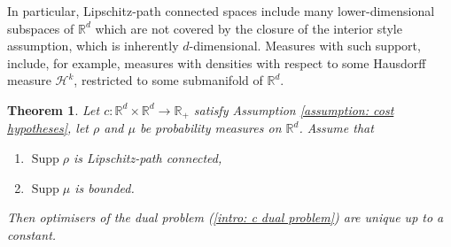 \documentclass[11pt, oneside, titlepage]{book}
\theoremstyle{plain}
\newtheorem{theorem}{Theorem}[chapter]
\theoremstyle{definition}
\newcommand{\R}{\mathbb{R}}
\DeclareMathOperator{\supp}{Supp}
\begin{document}
In particular, Lipschitz-path connected spaces include many lower-dimensional subspaces of $\R^d$ which are not covered by the closure of the interior style assumption, which is inherently $d$-dimensional. Measures with such support, include, for example, measures with densities with respect to some Hausdorff measure $\mathcal{H}^k$, restricted to some submanifold of $\R^d$.
\begin{theorem}
\label{thrm: uniqueness Lipschitz connected bounded}
Let $c: \R^d \times \R^d \to \R_+$ satisfy Assumption \ref{assumption: cost hypotheses}, let $\rho$ and $\mu$ be probability measures on $\R^d$.
Assume that
\begin{enumerate}[label=(\roman*)]
    \item $\supp \rho$ is Lipschitz-path connected,
    \item $\supp \mu$ is bounded.
\end{enumerate}
Then optimisers of the dual problem (\ref{intro: c dual problem}) are unique up to a constant.
\end{theorem}
\end{document}

